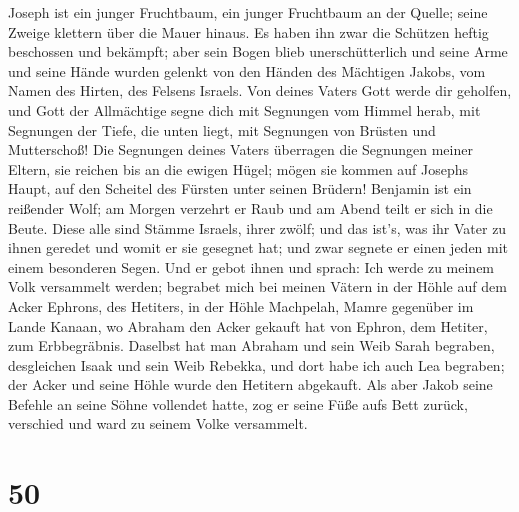 Joseph ist ein junger Fruchtbaum, ein junger Fruchtbaum an der Quelle;
seine Zweige klettern über die Mauer hinaus.  Es haben
ihn zwar die Schützen heftig beschossen und bekämpft; 
aber sein Bogen blieb unerschütterlich und seine Arme und seine Hände
wurden gelenkt von den Händen des Mächtigen Jakobs, vom Namen des
Hirten, des Felsens Israels.  Von deines Vaters Gott
werde dir geholfen, und Gott der Allmächtige segne dich mit Segnungen
vom Himmel herab, mit Segnungen der Tiefe, die unten liegt, mit
Segnungen von Brüsten und Mutterschoß!  Die Segnungen
deines Vaters überragen die Segnungen meiner Eltern, sie reichen bis an
die ewigen Hügel; mögen sie kommen auf Josephs Haupt, auf den Scheitel
des Fürsten unter seinen Brüdern!  Benjamin ist ein
reißender Wolf; am Morgen verzehrt er Raub und am Abend teilt er sich in
die Beute.  Diese alle sind Stämme Israels, ihrer zwölf;
und das ist's, was ihr Vater zu ihnen geredet und womit er sie gesegnet
hat; und zwar segnete er einen jeden mit einem besonderen Segen.
 Und er gebot ihnen und sprach: Ich werde zu meinem Volk
versammelt werden; begrabet mich bei meinen Vätern in der Höhle auf dem
Acker Ephrons, des Hetiters,  in der Höhle Machpelah,
Mamre gegenüber im Lande Kanaan, wo Abraham den Acker gekauft hat von
Ephron, dem Hetiter, zum Erbbegräbnis.  Daselbst hat man
Abraham und sein Weib Sarah begraben, desgleichen Isaak und sein Weib
Rebekka, und dort habe ich auch Lea begraben;  der Acker
und seine Höhle wurde den Hetitern abgekauft.  Als aber
Jakob seine Befehle an seine Söhne vollendet hatte, zog er seine Füße
aufs Bett zurück, verschied und ward zu seinem Volke versammelt.

\hypertarget{section-49}{%
\section{50}\label{section-49}}

